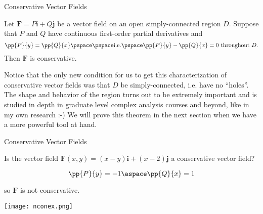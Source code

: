 \documentclass[11pt,english,
handout
]{beamer}
\begin{document}
\begin{frame}{Conservative Vector Fields}
\small

\begin{theorem}
Let $\mathbf{F}=P\mathbf{i}+Q\mathbf{j}$ be a vector field on an open simply-connected region $D$. Suppose that $P$ and $Q$ have continuous first-order partial derivatives and 
\[
\pp{P}{y}=\pp{Q}{x}\pspace\pspace\text{i.e.}\pspace\pp{P}{y}-\pp{Q}{x}=0\text{ throughout $D$.}
\]
Then $\mathbf{F}$ is conservative.
\end{theorem}

\lspace
Notice that the only new condition for us to get this characterization of conservative vector fields was that $D$ be simply-connected, i.e. have no ``holes''. \pause The shape and behavior of the region turns out to be extremely important and is studied in depth in graduate level complex analysis courses and beyond, like in my own research :-) \pause We will prove this theorem in the next section when we have a more powerful tool at hand.
\end{frame}








\begin{frame}[t]{Conservative Vector Fields}
\small
\begin{example}
Is the vector field $\mathbf{F}(x,y)=(x-y)\mathbf{i}+(x-2)\mathbf{j}$ a conservative vector field?\pause

\lspace
\begin{minipage}{0.5\textwidth}

\[
\pp{P}{y}=-1\aspace \pp{Q}{x}=1
\]

\lspace
so $\mathbf{F}$ is not conservative.
\vfill
\end{minipage}%
\begin{minipage}[c]{0.5\textwidth}
\centering
\texttt{[image: nconex.png]}
\end{minipage}
\end{example}
\end{frame}
\end{document}
